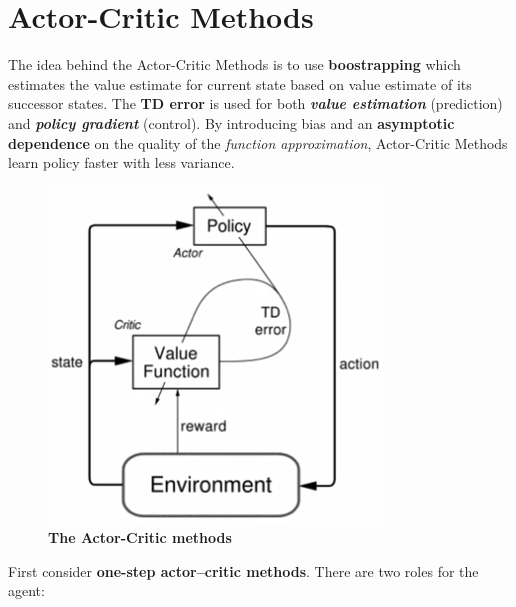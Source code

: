 \documentclass[11pt]{article}
\begin{document}
\section{Actor-Critic Methods}
The idea behind the Actor-Critic Methods is to use \textbf{boostrapping} which estimates the value estimate for current state based on value estimate of its successor states. The \textbf{TD error} is used for both \textbf{\emph{value estimation}} (prediction) and \emph{\textbf{policy gradient}} (control). By introducing bias and an \textbf{asymptotic dependence} on the quality of the \emph{function approximation}, Actor-Critic Methods learn policy faster with less variance. 
\begin{figure}
\begin{minipage}[t]{1\linewidth}
  \centering
  \centerline{\includegraphics[scale = 0.5]{actor_critic.png}}
\end{minipage}
\caption{\footnotesize{\textbf{The Actor-Critic methods}}}
\label{fig: actor_critic}
\end{figure}
First consider \textbf{one-step actor–critic methods}. There are two roles for the agent:
\end{document}
